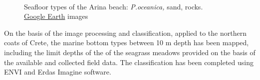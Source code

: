 \documentclass[10pt, a4paper]{article}
\begin{document}
\begin{figure}
	\centering
	\\
	\caption{Seafloor types of the Arina beach: \textit{P.oceanica,} sand, rocks. \\ \href{http://www.google.com/earth/index.html}{Google Earth} images}
	\label{fig:37}
\end{figure}

On the basis of the image processing and classification, applied to the northern coats of Crete, the
marine bottom types between 10 m depth has been mapped, including the limit depths of the of the
seagrass meadows provided on the basis of the available and collected field data. The classification
has been completed using ENVI and Erdas Imagine software.
\end{document}
